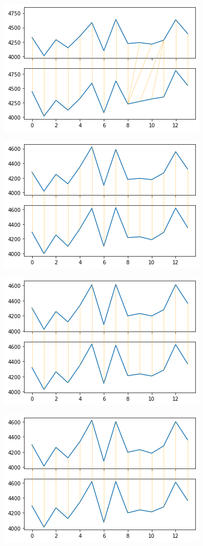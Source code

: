 \documentclass[12pt, twoside]{article}
\begin{document}
\includegraphics{vis11}

\includegraphics{vis22}

\includegraphics{vis33}

\includegraphics{vis44}
\end{document}
